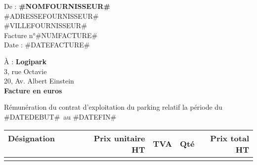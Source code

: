 \documentclass{facture}
\def\FactureNum {#NUMFACTURE#}	%
\def\DateFacture {#DATEFACTURE#}%
\def\datedebut {#DATEDEBUT#}		%
\def\datefin {#DATEFIN#}		%
\def\FactureDescr {				%
Rémunération du contrat d'exploitation du parking relatif la période du \datedebut~au \datefin
}
\def\ClientNom{Logipark}	%
\def\ClientAdresse{3, rue Octavie}
\def\ClientVille{20, Av. Albert Einstein}
\def\NomSociete{#NOMFOURNISSEUR#}
\def\AdresseSociete{#ADRESSEFOURNISSEUR#}
\def\VilleSociete{#VILLEFOURNISSEUR#}
\begin{document}
De : \textbf{\NomSociete} \\
\AdresseSociete \\
\VilleSociete \\

Facture n°\FactureNum \\
Date : \DateFacture


\hspace*{10.5cm} À : \textbf{\ClientNom} \\
\hspace*{10.5cm} \ClientAdresse \\
\hspace*{10.5cm} \ClientVille \\

{\huge \textbf{Facture en euros}}

\textnormal{\FactureDescr}

\begin{center}
    \begin{tabular}{lrrrr}
        \textbf{Désignation ~~~~~~} & \textbf{Prix unitaire HT} & \textbf{TVA} & \textbf{Qté} & \textbf{Prix total HT} \\
        \hline
        \AfficheResultat{}
    \end{tabular}
\end{center}
\end{document}
